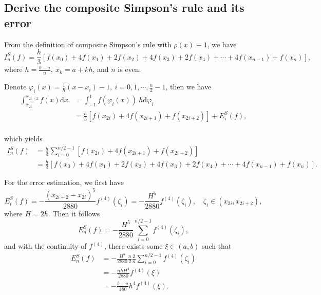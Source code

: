 \documentclass[a4paper]{article}
\begin{document}
\subsection{Derive the composite Simpson's rule and its error}

From the definition of composite Simpson's rule with $\rho(x) \equiv 1$, we have
\begin{equation}
    I_n^S(f) = \frac{h}{3}[f(x_0) + 4f(x_1) + 2f(x_2) + 4f(x_3) + 2f(x_4) + \cdots + 4f(x_{n - 1}) + f(x_n)],
    \label{eq:1_composite_simpson}
\end{equation}
where $h = \frac{b - a}{n},\ x_k = a + kh$, and $n$ is even.

Denote $\varphi_i(x) = \frac{1}{h}(x - x_i) - 1,\ i = 0, 1, \cdots, \frac{n}{2} - 1$, then we have
\begin{equation}
    \begin{aligned}
        \int_{x_{2i}}^{x_{2i + 2}} f(x) \mathrm{d} x &= \int_{-1}^1 f(\varphi_i(x))\ h\mathrm{d}\varphi_i \\
        &= \frac{h}{3} \left[f(x_{2i}) + 4f(x_{2i + 1}) + f(x_{2i + 2})\right] + E_i^S(f), \\
    \end{aligned}
    \label{eq:1_composite_simpson_integral}
\end{equation}

which yields
\begin{equation}
    \begin{aligned}
        I_n^S(f) &= \frac{h}{3} \sum_{i = 0}^{n / 2 - 1} \left[f(x_{2i}) + 4f(x_{2i + 1}) + f(x_{2i + 2})\right] \\
        &= \frac{h}{3} \left[ f(x_0) + 4f(x_1) + 2f(x_2) + 4f(x_3) + 2f(x_4) + \cdots + 4f(x_{n - 1}) + f(x_n) \right].
    \end{aligned}
    \label{eq:1_composite_simpson_final}
\end{equation}

For the error estimation, we first have 
\begin{equation}
    E_i^S(f) = -\frac{(x_{2i + 2} -x_{2i})^5}{2880} f^{(4)}(\zeta_i) = -\frac{H^5}{2880} f^{(4)}(\zeta_i), \quad \zeta_i \in (x_{2i}, x_{2i + 2}),
    \label{eq:1_composite_simpson_error}
\end{equation}
where $H = 2h$. Then it follows
\begin{equation}
    E_n^S(f) = -\frac{H^5}{2880} \sum_{i = 0}^{n/2 - 1}f^{(4)}(\zeta_i), 
    \label{eq:1_composite_simpson_error_sum}
\end{equation}
and with the continuity of $f^{(4)}$, there exists some $\xi \in (a, b)$ such that
\begin{equation}
    \begin{aligned}
        E_n^S(f) & = -\frac{H^5}{2880} \frac{n}{2} \frac{2}{n} \sum_{i = 0}^{n/2 - 1} f^{(4)}(\zeta_i) \\
        & = -\frac{nhH^4}{2880} f^{(4)}(\xi) \\
        & = -\frac{b - a}{180} h^4 f^{(4)}(\xi).       
    \end{aligned}
    \label{eq:1_composite_simpson_error_final}
\end{equation}
\end{document}
